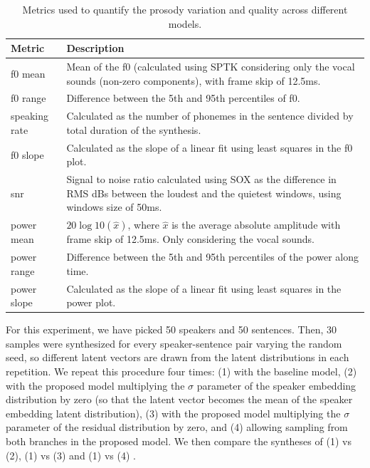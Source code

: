\begin{table}
	\footnotesize
		\centering
	\caption{Metrics used to quantify the prosody variation and quality across different models.}
	\begin{tabular}{p{}|p{}}
		\toprule
		Metric & Description \\
		\midrule
		f0 mean &  Mean of the f0 (calculated using SPTK \autocite{sptk} considering only the vocal sounds (non-zero components), with frame skip of 12.5ms.\\
		f0 range & Difference between the 5th and 95th percentiles of f0. \\
		speaking rate & Calculated as the number of phonemes in the sentence divided by total duration of the synthesis. \\
		f0 slope & Calculated as the slope of a linear fit using least squares in the f0 plot. \\
		snr & Signal to noise ratio calculated using SOX \autocite{SOX} as the difference in RMS dBs between the loudest and the quietest windows, using windows size of 50ms. \\
		power mean & $20\log10(\hat{x})$, where $\hat{x}$ is the average absolute amplitude with frame skip of 12.5ms. Only considering the vocal sounds. \\
		power range & Difference between the 5th and 95th percentiles of the power along time. \\
		power slope & Calculated as the slope of a linear fit using least squares in the power plot. \\
		\bottomrule
	\end{tabular}
	\label{tab:metrics}
\end{table}

For this experiment, we have picked 50 speakers and 50 sentences. Then, 30 samples were synthesized for every speaker-sentence pair varying the random seed, so different latent vectors are drawn from the latent distributions in each repetition. We repeat this procedure four times: (1) with the baseline model, (2) with the proposed model multiplying the $\sigma$ parameter of the speaker embedding distribution by zero (so that the latent vector becomes the mean of the speaker embedding latent distribution), (3) with the proposed model multiplying the $\sigma$ parameter of the residual distribution by zero, and (4) allowing sampling from both branches in the proposed model. We then compare the syntheses of (1) vs (2), (1) vs (3) and (1) vs (4) .

